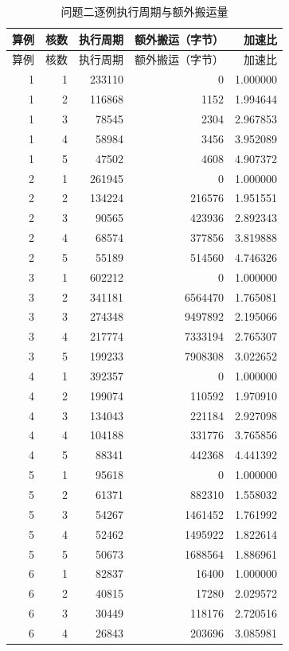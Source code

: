 \begin{longtable}{rrrrr}
\caption{问题二逐例执行周期与额外搬运量}\label{tab:q2-r07-appendix}\\
\toprule
算例 & 核数 & 执行周期 & 额外搬运（字节） & 加速比 \\
\midrule\endfirsthead
\toprule
算例 & 核数 & 执行周期 & 额外搬运（字节） & 加速比 \\
\midrule\endhead
1 & 1 & 233110 & 0 & 1.000000 \\
1 & 2 & 116868 & 1152 & 1.994644 \\
1 & 3 & 78545 & 2304 & 2.967853 \\
1 & 4 & 58984 & 3456 & 3.952089 \\
1 & 5 & 47502 & 4608 & 4.907372 \\
2 & 1 & 261945 & 0 & 1.000000 \\
2 & 2 & 134224 & 216576 & 1.951551 \\
2 & 3 & 90565 & 423936 & 2.892343 \\
2 & 4 & 68574 & 377856 & 3.819888 \\
2 & 5 & 55189 & 514560 & 4.746326 \\
3 & 1 & 602212 & 0 & 1.000000 \\
3 & 2 & 341181 & 6564470 & 1.765081 \\
3 & 3 & 274348 & 9497892 & 2.195066 \\
3 & 4 & 217774 & 7333194 & 2.765307 \\
3 & 5 & 199233 & 7908308 & 3.022652 \\
4 & 1 & 392357 & 0 & 1.000000 \\
4 & 2 & 199074 & 110592 & 1.970910 \\
4 & 3 & 134043 & 221184 & 2.927098 \\
4 & 4 & 104188 & 331776 & 3.765856 \\
4 & 5 & 88341 & 442368 & 4.441392 \\
5 & 1 & 95618 & 0 & 1.000000 \\
5 & 2 & 61371 & 882310 & 1.558032 \\
5 & 3 & 54267 & 1461452 & 1.761992 \\
5 & 4 & 52462 & 1495922 & 1.822614 \\
5 & 5 & 50673 & 1688564 & 1.886961 \\
6 & 1 & 82837 & 16400 & 1.000000 \\
6 & 2 & 40815 & 17280 & 2.029572 \\
6 & 3 & 30449 & 118176 & 2.720516 \\
6 & 4 & 26843 & 203696 & 3.085981 \\

\end{longtable}
